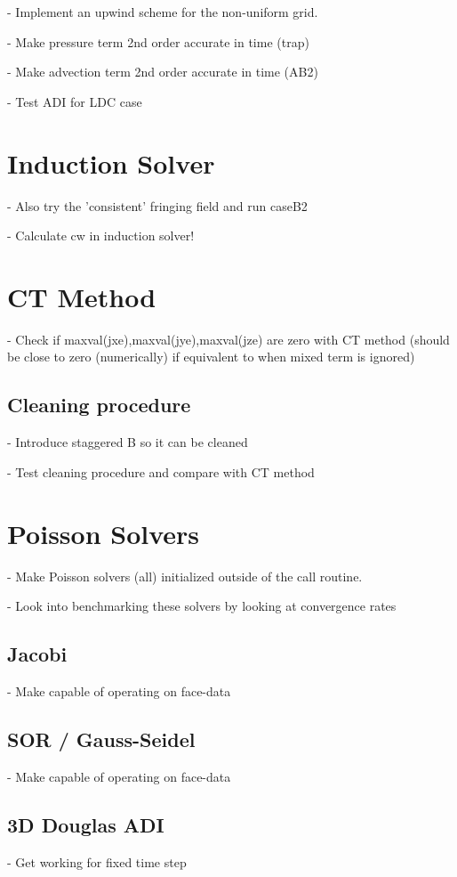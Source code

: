 \documentclass[11pt]{article}
\begin{document}
- Implement an upwind scheme for the non-uniform grid.

- Make pressure term 2nd order accurate in time (trap)

- Make advection term 2nd order accurate in time (AB2)

- Test ADI for LDC case


\section{Induction Solver}

- Also try the 'consistent' fringing field and run caseB2

- Calculate cw in induction solver!

\section{CT Method}

- Check if maxval(jxe),maxval(jye),maxval(jze) are zero with CT method (should be
  close to zero (numerically) if equivalent to when mixed term is ignored)


\subsection{Cleaning procedure}
- Introduce staggered B so it can be cleaned

- Test cleaning procedure and compare with CT method

\section{Poisson Solvers}
- Make Poisson solvers (all) initialized outside of the call routine.

- Look into benchmarking these solvers by looking at convergence rates


\subsection{Jacobi}
- Make capable of operating on face-data

\subsection{SOR / Gauss-Seidel}
- Make capable of operating on face-data

\subsection{3D Douglas ADI}
- Get working for fixed time step
\end{document}
